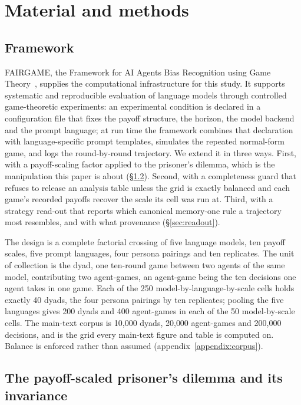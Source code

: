 \documentclass[openacc]{rsproca_new}
\begin{document}
\section{Material and methods}\label{sec:methodology}

\subsection{Framework}\label{sec:background}

FAIRGAME, the Framework for AI Agents Bias Recognition using Game
Theory~\cite{buscemi2025fairgame}, supplies the computational infrastructure
for this study. It supports systematic and reproducible evaluation of language
models through controlled game-theoretic experiments: an experimental condition
is declared in a configuration file that fixes the payoff structure, the
horizon, the model backend and the prompt language; at run time the framework
combines that declaration with language-specific prompt templates, simulates
the repeated normal-form game, and logs the round-by-round trajectory. We
extend it in three ways. First, with a payoff-scaling factor applied to the
prisoner's dilemma, which is the manipulation this paper is about
(\S\ref{sec:gameImportance}). Second, with a completeness guard that refuses to
release an analysis table unless the grid is exactly balanced and each game's
recorded payoffs recover the scale its cell was run at. Third, with a strategy
read-out that reports which canonical memory-one rule a trajectory most
resembles, and with what provenance (\S\ref{sec:readout}).

The design is a complete factorial crossing of five language models, ten payoff
scales, five prompt languages, four persona pairings and ten replicates. The
unit of collection is the dyad, one ten-round game between two agents of the
same model, contributing two agent-games, an agent-game being the ten decisions
one agent takes in one game. Each of the 250 model-by-language-by-scale cells
holds exactly 40 dyads, the four persona pairings by ten replicates; pooling
the five languages gives 200 dyads and 400 agent-games in each of the 50
model-by-scale cells. The main-text corpus is 10{,}000 dyads, 20{,}000
agent-games and 200{,}000 decisions, and is the grid every main-text figure and
table is computed on. Balance is enforced rather than assumed
(appendix~\ref{appendix:corpus}).

\subsection{The payoff-scaled prisoner's dilemma and its invariance}\label{sec:gameImportance}
\end{document}
